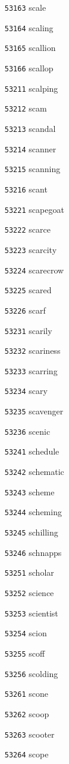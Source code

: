 \documentclass[twoside,11pt]{article}
\begin{document}
\begin{multicols}{5}
\begin{enumerate}
\item[\texttt{53163}] scale
\item[\texttt{53164}] scaling
\item[\texttt{53165}] scallion
\item[\texttt{53166}] scallop
\item[\texttt{53211}] scalping
\item[\texttt{53212}] scam
\item[\texttt{53213}] scandal
\item[\texttt{53214}] scanner
\item[\texttt{53215}] scanning
\item[\texttt{53216}] scant
\item[\texttt{53221}] scapegoat
\item[\texttt{53222}] scarce
\item[\texttt{53223}] scarcity
\item[\texttt{53224}] scarecrow
\item[\texttt{53225}] scared
\item[\texttt{53226}] scarf
\item[\texttt{53231}] scarily
\item[\texttt{53232}] scariness
\item[\texttt{53233}] scarring
\item[\texttt{53234}] scary
\item[\texttt{53235}] scavenger
\item[\texttt{53236}] scenic
\item[\texttt{53241}] schedule
\item[\texttt{53242}] schematic
\item[\texttt{53243}] scheme
\item[\texttt{53244}] scheming
\item[\texttt{53245}] schilling
\item[\texttt{53246}] schnapps
\item[\texttt{53251}] scholar
\item[\texttt{53252}] science
\item[\texttt{53253}] scientist
\item[\texttt{53254}] scion
\item[\texttt{53255}] scoff
\item[\texttt{53256}] scolding
\item[\texttt{53261}] scone
\item[\texttt{53262}] scoop
\item[\texttt{53263}] scooter
\item[\texttt{53264}] scope

\end{enumerate}
\end{multicols}
\end{document}
